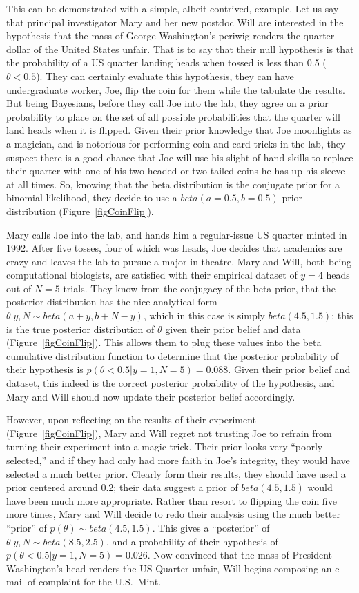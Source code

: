 \documentclass[letterpaper,12pt]{article}
\begin{document}
\begin{linenumbers}
This can be demonstrated with a simple, albeit contrived, example.
Let us say that principal investigator Mary and her new postdoc Will are
interested in the hypothesis that the mass of George Washington's periwig
renders the quarter dollar of the United States unfair.
That is to say that their null hypothesis is that the probability of a US
quarter landing heads when tossed is less than 0.5 ($\theta < 0.5$).
They can certainly evaluate this hypothesis, they can have undergraduate
worker, Joe, flip the coin for them while the tabulate the results.
But being Bayesians, before they call Joe into the lab, they agree on a
prior probability to place on the set of all possible probabilities that
the quarter will land heads when it is flipped.
Given their prior knowledge that Joe moonlights as a magician, and is notorious
for performing coin and card tricks in the lab, they suspect there is a good
chance that Joe will use his slight-of-hand skills to replace their quarter
with one of his two-headed or two-tailed coins he has up his sleeve at all
times.
So, knowing that the beta distribution is the conjugate prior for a binomial
likelihood, they decide to use a $beta(a=0.5, b=0.5)$ prior distribution
(Figure~\ref{figCoinFlip}).

Mary calls Joe into the lab, and hands him a regular-issue US quarter minted in
1992.
After five tosses, four of which was heads, Joe decides that academics are
crazy and leaves the lab to pursue a major in theatre.  Mary and Will, both
being computational biologists, are satisfied with their
empirical dataset of $y = 4$ heads out of $N = 5$ trials.
They know from the conjugacy of the beta prior, that the posterior distribution
has the nice analytical form $\theta|y,N \sim beta(a + y, b + N - y)$, which
in this case is simply $beta(4.5, 1.5)$; this is the true posterior distribution
of $\theta$ given their prior belief and data (Figure~\ref{figCoinFlip}).
This allows them to plug these values into the beta cumulative distribution
function to determine that the posterior probability of their hypothesis is
$p(\theta < 0.5 | y=1, N=5) = 0.088$.
Given their prior belief and dataset, this indeed is the correct posterior
probability of the hypothesis, and Mary and Will should now update their
posterior belief accordingly.

However, upon reflecting on the results of their experiment
(Figure~\ref{figCoinFlip}), Mary and Will regret not trusting Joe to refrain
from turning their experiment into a magic trick.
Their prior looks very ``poorly selected,'' and if they had only
had more faith in Joe's integrity, they would have selected a much better
prior. Clearly form their results, they should have used a prior centered
around 0.2; their data suggest a prior of $beta(4.5, 1.5)$ would have been
much more appropriate.
Rather than resort to flipping the coin five more times, Mary and Will decide
to redo their analysis using the much better ``prior'' of $p(\theta) \sim
beta(4.5, 1.5)$.
This gives a ``posterior'' of $\theta|y,N \sim beta(8.5, 2.5)$, and a
probability of their hypothesis of $p(\theta < 0.5 | y=1, N=5) = 0.026$.
Now convinced that the mass of President Washington's head renders the US
Quarter unfair, Will begins composing an e-mail of complaint for the U.S.\
Mint.


\end{linenumbers}
\end{document}
